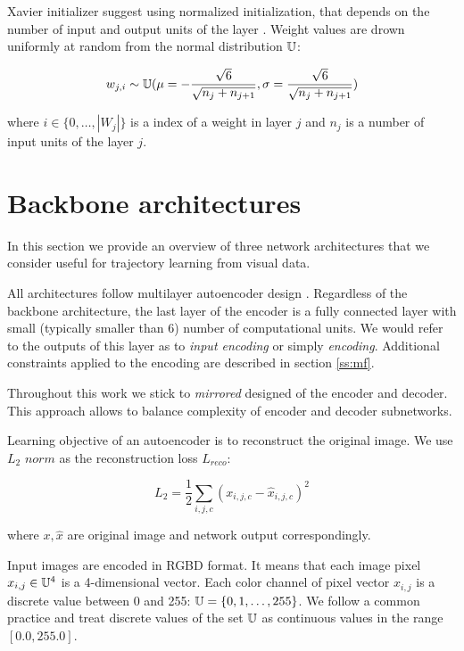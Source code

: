 Xavier initializer suggest using normalized initialization, that depends on the number of input and output units of the layer \cite{Good2016}.
Weight values are drown uniformly at random from the normal distribution $\Bbb{U}$:

\begin{equation}\label{eq:xavier}
  w_{j, i} \sim \Bbb{U}(
  \mu=-\frac{\sqrt{6}}{\sqrt{n_j+n_{j+1}}},
  \sigma=\frac{\sqrt{6}}{\sqrt{n_j+n_{j+1}}})
\end{equation}

where $i\in\{0, \ldots, |W_j|\}$ is a index of a weight in layer $j$ and $n_j$ is a number of input units of the layer $j$.


\section{Backbone architectures}

In this section we provide an overview of three network architectures that we consider useful for trajectory learning from visual data.

All architectures follow multilayer autoencoder design \cite{Hinton2006}.
Regardless of the backbone architecture, the last layer of the encoder is a fully connected layer with small (typically smaller than 6) number of computational units.
We would refer to the outputs of this layer as to  \textit{input encoding} or simply \textit{encoding}.
Additional constraints applied to the encoding are described in section \ref{ss:mf}.

Throughout this work we stick to \textit{mirrored} designed of the encoder and decoder.
This approach allows to balance complexity of encoder and decoder subnetworks.

Learning objective of an autoencoder is to reconstruct the original image.
We use $L_2$ $norm$ as the reconstruction loss $L_{reco}$:

\begin{equation}
  L_{2} = \frac{1}{2} \sum_{i, j, c} (x_{i,j,c} - \hat{x}_{i,j,c})^2
\end{equation}

where $x, \hat{x}$ are original image and network output correspondingly.

Input images are encoded in RGBD format. It means that each image pixel $x_{i,j} \in \Bbb{U}^4$ is a 4-dimensional vector.
Each color channel of pixel vector $x_{i,j}$ is a discrete value between 0 and 255: $\Bbb{U} = \{0, 1, \ldots, 255 \}$.
We follow a common practice and treat discrete values of the set $\Bbb{U}$ as continuous values in the range $[0.0, 255.0]$.

